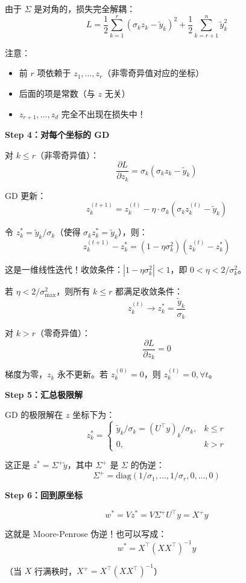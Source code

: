 \documentclass[12pt, a4paper]{ctexart}
\begin{document}
\begin{blackboard}
由于 $\Sigma$ 是对角的，损失完全解耦：
\[
L = \frac{1}{2}\sum_{k=1}^{r} (\sigma_k z_k - \tilde{y}_k)^2 + \frac{1}{2}\sum_{k=r+1}^{n} \tilde{y}_k^2
\]

注意：
\begin{itemize}
    \item 前 $r$ 项依赖于 $z_1, \ldots, z_r$（非零奇异值对应的坐标）
    \item 后面的项是常数（与 $z$ 无关）
    \item $z_{r+1}, \ldots, z_d$ 完全不出现在损失中！
\end{itemize}

\textbf{Step 4：对每个坐标的 GD}

对 $k \leq r$（非零奇异值）：
\[
\frac{\partial L}{\partial z_k} = \sigma_k(\sigma_k z_k - \tilde{y}_k)
\]

GD 更新：
\[
z_k^{(t+1)} = z_k^{(t)} - \eta \cdot \sigma_k(\sigma_k z_k^{(t)} - \tilde{y}_k)
\]

令 $z_k^* = \tilde{y}_k / \sigma_k$（使得 $\sigma_k z_k^* = \tilde{y}_k$），则：
\[
z_k^{(t+1)} - z_k^* = (1 - \eta \sigma_k^2)(z_k^{(t)} - z_k^*)
\]

这是一维线性迭代！收敛条件：$|1 - \eta \sigma_k^2| < 1$，即 $0 < \eta < 2/\sigma_k^2$。

若 $\eta < 2/\sigma_{\max}^2$，则所有 $k \leq r$ 都满足收敛条件：
\[
z_k^{(t)} \to z_k^* = \frac{\tilde{y}_k}{\sigma_k}
\]

对 $k > r$（零奇异值）：
\[
\frac{\partial L}{\partial z_k} = 0
\]

梯度为零，$z_k$ 永不更新。若 $z_k^{(0)} = 0$，则 $z_k^{(t)} = 0, \forall t$。

\textbf{Step 5：汇总极限解}

GD 的极限解在 $z$ 坐标下为：
\[
z_k^* = \begin{cases}
\tilde{y}_k / \sigma_k = (U^\top y)_k / \sigma_k, & k \leq r \\
0, & k > r
\end{cases}
\]

这正是 $z^* = \Sigma^+ \tilde{y}$，其中 $\Sigma^+$ 是 $\Sigma$ 的伪逆：
\[
\Sigma^+ = \text{diag}(1/\sigma_1, \ldots, 1/\sigma_r, 0, \ldots, 0)
\]

\textbf{Step 6：回到原坐标}

\[
w^* = Vz^* = V\Sigma^+ U^\top y = X^+ y
\]

这就是 Moore-Penrose 伪逆！也可以写成：
\[
\boxed{w^* = X^\top (XX^\top)^{-1} y}
\]

（当 $X$ 行满秩时，$X^+ = X^\top(XX^\top)^{-1}$）

\end{blackboard}
\end{document}
